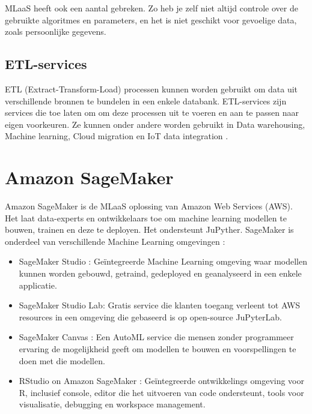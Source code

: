 MLaaS heeft ook een aantal gebreken. Zo heb je zelf niet altijd controle over de gebruikte algoritmes en parameters, en het is niet geschikt voor gevoelige data, zoals persoonlijke gegevens.

\subsection{ETL-services}
ETL (Extract-Transform-Load)  processen kunnen worden gebruikt om data uit verschillende bronnen te bundelen in een enkele databank. ETL-services zijn services die toe laten om om deze processen uit te voeren en aan te passen naar eigen voorkeuren. Ze kunnen onder andere worden gebruikt in Data warehousing, Machine learning, Cloud migration en IoT data integration \autocite{Diouf2018}.

\section{Amazon SageMaker}
Amazon SageMaker is de MLaaS oplossing van Amazon Web Services (AWS). Het laat data-experts en ontwikkelaars toe om machine learning modellen te bouwen, trainen en deze te deployen. Het ondersteunt JuPyther. SageMaker is onderdeel van verschillende Machine Learning omgevingen : 
\begin{itemize}[]
    \item SageMaker Studio : Geïntegreerde Machine Learning omgeving waar modellen kunnen worden gebouwd, getraind, gedeployed en geanalyseerd in een enkele applicatie. 
    \item SageMaker Studio Lab: Gratis service die klanten  toegang verleent tot AWS resources in een omgeving die gebaseerd is op open-source JuPyterLab. 
    \item SageMaker Canvas : Een AutoML service die mensen zonder programmeer ervaring de mogelijkheid geeft om modellen te bouwen en voorspellingen te doen met die modellen.
    \item RStudio on Amazon SageMaker :  Geïntegreerde ontwikkelings omgeving voor R, inclusief console, editor die het uitvoeren van code ondersteunt, tools voor visualisatie, debugging en workspace management. 
 \end{itemize}

